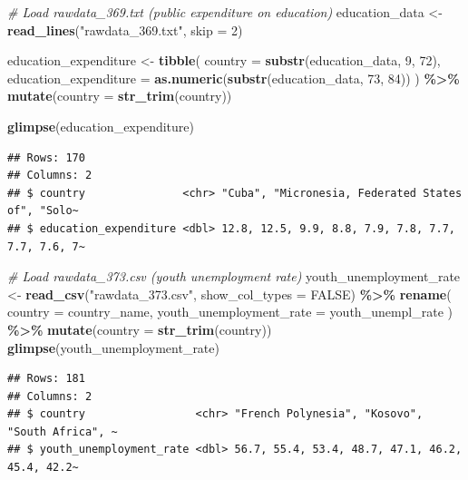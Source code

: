 \documentclass[
]{article}
\newenvironment{Shaded}{\begin{snugshade}}{\end{snugshade}}
\newcommand{\AttributeTok}[1]{\textcolor[rgb]{0.13,0.29,0.53}{#1}}
\newcommand{\CommentTok}[1]{\textcolor[rgb]{0.56,0.35,0.01}{\textit{#1}}}
\newcommand{\ConstantTok}[1]{\textcolor[rgb]{0.56,0.35,0.01}{#1}}
\newcommand{\DecValTok}[1]{\textcolor[rgb]{0.00,0.00,0.81}{#1}}
\newcommand{\FunctionTok}[1]{\textcolor[rgb]{0.13,0.29,0.53}{\textbf{#1}}}
\newcommand{\NormalTok}[1]{#1}
\newcommand{\OtherTok}[1]{\textcolor[rgb]{0.56,0.35,0.01}{#1}}
\newcommand{\SpecialCharTok}[1]{\textcolor[rgb]{0.81,0.36,0.00}{\textbf{#1}}}
\newcommand{\StringTok}[1]{\textcolor[rgb]{0.31,0.60,0.02}{#1}}
\begin{document}
\begin{Shaded}
\begin{Highlighting}[]
\CommentTok{\# Load rawdata\_369.txt (public expenditure on education)}
\NormalTok{education\_data }\OtherTok{\textless{}{-}} \FunctionTok{read\_lines}\NormalTok{(}\StringTok{"rawdata\_369.txt"}\NormalTok{, }\AttributeTok{skip =} \DecValTok{2}\NormalTok{)}

\NormalTok{education\_expenditure }\OtherTok{\textless{}{-}} \FunctionTok{tibble}\NormalTok{(}
  \AttributeTok{country =} \FunctionTok{substr}\NormalTok{(education\_data, }\DecValTok{9}\NormalTok{, }\DecValTok{72}\NormalTok{),}
  \AttributeTok{education\_expenditure =} \FunctionTok{as.numeric}\NormalTok{(}\FunctionTok{substr}\NormalTok{(education\_data, }\DecValTok{73}\NormalTok{, }\DecValTok{84}\NormalTok{))}
\NormalTok{) }\SpecialCharTok{\%\textgreater{}\%}
  \FunctionTok{mutate}\NormalTok{(}\AttributeTok{country =} \FunctionTok{str\_trim}\NormalTok{(country))}

\FunctionTok{glimpse}\NormalTok{(education\_expenditure)}
\end{Highlighting}
\end{Shaded}

\begin{verbatim}
## Rows: 170
## Columns: 2
## $ country               <chr> "Cuba", "Micronesia, Federated States of", "Solo~
## $ education_expenditure <dbl> 12.8, 12.5, 9.9, 8.8, 7.9, 7.8, 7.7, 7.7, 7.6, 7~
\end{verbatim}

\begin{Shaded}
\begin{Highlighting}[]
\CommentTok{\# Load rawdata\_373.csv (youth unemployment rate)}
\NormalTok{youth\_unemployment\_rate }\OtherTok{\textless{}{-}} \FunctionTok{read\_csv}\NormalTok{(}\StringTok{"rawdata\_373.csv"}\NormalTok{, }\AttributeTok{show\_col\_types =} \ConstantTok{FALSE}\NormalTok{) }\SpecialCharTok{\%\textgreater{}\%}
  \FunctionTok{rename}\NormalTok{(}
    \AttributeTok{country =}\NormalTok{ country\_name,}
    \AttributeTok{youth\_unemployment\_rate =}\NormalTok{ youth\_unempl\_rate}
\NormalTok{  ) }\SpecialCharTok{\%\textgreater{}\%}
  \FunctionTok{mutate}\NormalTok{(}\AttributeTok{country =} \FunctionTok{str\_trim}\NormalTok{(country))}
\FunctionTok{glimpse}\NormalTok{(youth\_unemployment\_rate)}
\end{Highlighting}
\end{Shaded}

\begin{verbatim}
## Rows: 181
## Columns: 2
## $ country                 <chr> "French Polynesia", "Kosovo", "South Africa", ~
## $ youth_unemployment_rate <dbl> 56.7, 55.4, 53.4, 48.7, 47.1, 46.2, 45.4, 42.2~
\end{verbatim}
\end{document}
